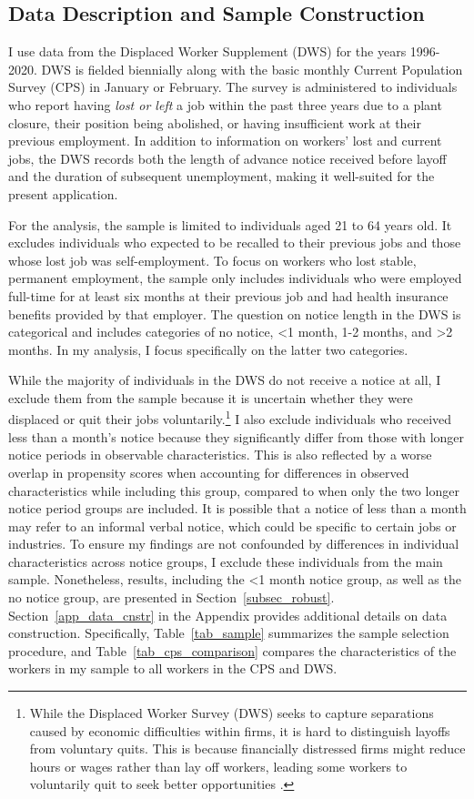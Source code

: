 \documentclass{div}
\newcommand{\agecutoff}{21 to 64 }
\begin{document}
\subsection{Data Description and Sample Construction}\label{subsec_description}

I use data from the Displaced Worker Supplement (DWS) for the years 1996-2020. DWS is fielded biennially along with the basic monthly Current Population Survey (CPS) in January or February. The survey is administered to individuals who report having \textit{lost or left} a job within the past three years due to a plant closure, their position being abolished, or having insufficient work at their previous employment. In addition to information on workers’ lost and current jobs, the DWS records both the length of advance notice received before layoff and the duration of subsequent unemployment, making it well-suited for the present application.

For the analysis, the sample is limited to individuals aged \agecutoff years old. It excludes individuals who expected to be recalled to their previous jobs and those whose lost job was self-employment. To focus on workers who lost stable, permanent employment, the sample only includes individuals who were employed full-time for at least six months at their previous job and had health insurance benefits provided by that employer. The question on notice length in the DWS is categorical and includes categories of no notice, <1 month, 1-2 months, and >2 months. In my analysis, I focus specifically on the latter two categories. 

While the majority of individuals in the DWS do not receive a notice at all, I exclude them from the sample because it is uncertain whether they were displaced or quit their jobs voluntarily.\footnote{While the Displaced Worker Survey (DWS) seeks to capture separations caused by economic difficulties within firms, it is hard to distinguish layoffs from voluntary quits. This is because financially distressed firms might reduce hours or wages rather than lay off workers, leading some workers to voluntarily quit to seek better opportunities \citep{Farber2017}.} I also exclude individuals who received less than a month’s notice because they significantly differ from those with longer notice periods in observable characteristics. This is also reflected by a worse overlap in propensity scores when accounting for differences in observed characteristics while including this group, compared to when only the two longer notice period groups are included. It is possible that a notice of less than a month may refer to an informal verbal notice, which could be specific to certain jobs or industries. To ensure my findings are not confounded by differences in individual characteristics across notice groups, I exclude these individuals from the main sample. Nonetheless, results, including the <1 month notice group, as well as the no notice group, are presented in Section~\ref{subsec_robust}. Section~\ref{app_data_cnstr} in the Appendix provides additional details on data construction. Specifically, Table~\ref{tab_sample} summarizes the sample selection procedure, and Table~\ref{tab_cps_comparison} compares the characteristics of the workers in my sample to all workers in the CPS and DWS.
\end{document}
